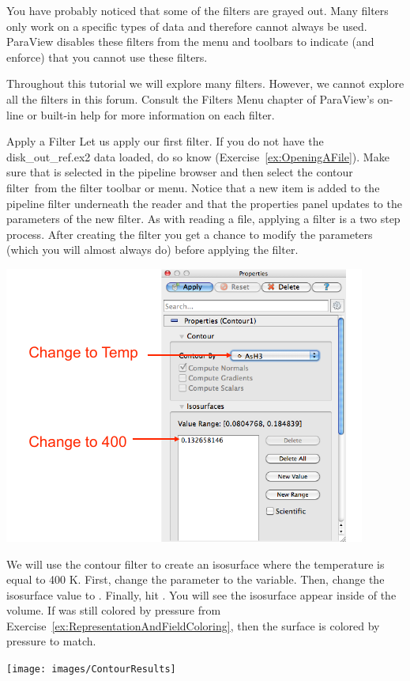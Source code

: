 You have probably noticed that some of the filters are grayed out.  Many
filters only work on a specific types of data and therefore cannot always
be used.  ParaView disables these filters from the menu and toolbars to
indicate (and enforce) that you cannot use these filters.

Throughout this tutorial we will explore many filters.  However, we cannot
explore all the filters in this forum.  Consult the Filters Menu chapter of
ParaView's on-line or built-in help for more information on each filter.

\begin{exercise}{Apply a Filter}
  \label{ex:ApplyAFilter}%
  Let us apply our first filter.  If you do not have the disk\_out\_ref.ex2
  data loaded, do so know (Exercise~\ref{ex:OpeningAFile}).  Make sure that
   is selected in the pipeline browser and then
  select the contour filter~\contour from the filter toolbar or
   menu.  Notice that a new item is added to the pipeline
  filter underneath the reader and that the properties panel updates to the
  parameters of the new filter.  As with reading a file, applying a filter
  is a two step process.  After creating the filter you get a chance to
  modify the parameters (which you will almost always do) before applying
  the filter.


  \begin{inlinefig}
    \includegraphics[scale=\bbscale]{images/ContourOptions}
  \end{inlinefig}

  We will use the contour filter to create an isosurface where the
  temperature is equal to 400 K.  First, change the 
  parameter to the  variable.  Then, change the isosurface value
  to .  Finally, hit \apply.  You will see the isosurface appear
  inside of the volume.  If  was still colored by
  pressure from Exercise~\ref{ex:RepresentationAndFieldColoring}, then the
  surface is colored by pressure to match.

  \begin{inlinefig}
    \texttt{[image: images/ContourResults]}
  \end{inlinefig}

\end{exercise}

